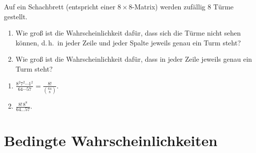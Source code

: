 %

 Auf ein Schachbrett (entspricht einer 
$8\times 8$-Matrix) werden zufällig $8$ Türme gestellt. 
\begin{enumerate}
    \item Wie groß ist die Wahrscheinlichkeit dafür, dass sich die Türme nicht
        sehen können, d.\,h.\ in jeder Zeile und jeder Spalte jeweils genau ein
        Turm steht?
    \item Wie groß ist die Wahrscheinlichkeit dafür, dass in jeder Zeile jeweils
        genau ein Turm steht?
\end{enumerate}

\solution
\begin{enumerate}
    \item $\frac{8^2 7^2 \cdots 1^2}{ 64 \cdots 57} = \frac{8!}{ \binom{64}{8}}$.
    \item $\frac{8!\, 8^8}{64 \dots 57}$.
\end{enumerate}

\section{Bedingte Wahrscheinlichkeiten}



